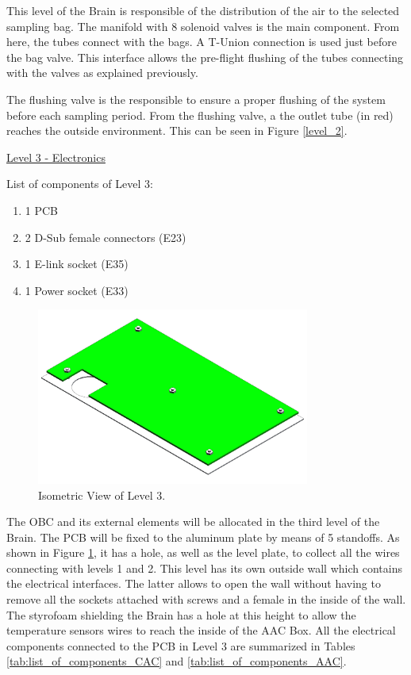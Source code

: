 \smallskip
This level of the Brain is responsible of the distribution of the air to the selected sampling bag. The manifold with 8 solenoid valves is the main component. From here, the tubes connect with the bags. A T-Union connection is used just before the bag valve. This interface allows the pre-flight flushing of the tubes connecting with the valves as explained previously. 

\smallskip
The flushing valve is the responsible to ensure a proper flushing of the system before each sampling period. From the flushing valve, a the outlet tube (in red) reaches the outside environment. This can be seen in Figure \ref{level_2}.



\pagebreak
\underline{Level 3 - Electronics}


List of components of Level 3:
\begin{enumerate}[label=\Alph*.]
    \item 1 PCB
    \item 2 D-Sub female connectors (E23)
    \item 1 E-link socket (E35)
    \item 1 Power socket (E33)
\end{enumerate}


\begin{figure}[H]
    \centering
    \includegraphics[width=0.8\textwidth]{4-experiment-design/img/Mechanical/Level_3.png}
    \caption{Isometric View of Level 3.}
    \label{level_3}
\end{figure}

\smallskip
The OBC and its external elements will be allocated in the third level of the Brain. The PCB will be fixed to the aluminum plate by means of 5 standoffs. As shown in Figure \ref{level_3}, it has a hole, as well as the level plate, to collect all the wires connecting with levels 1 and 2. This level has its own outside wall which contains the electrical interfaces. The latter allows to open the wall without having to remove all the sockets attached with screws and a female in the inside of the wall. The styrofoam shielding the Brain has a hole at this height to allow the temperature sensors wires to reach the inside of the AAC Box. All the electrical components connected to the PCB in Level 3 are summarized in Tables \ref{tab:list_of_components_CAC} and \ref{tab:list_of_components_AAC}.

